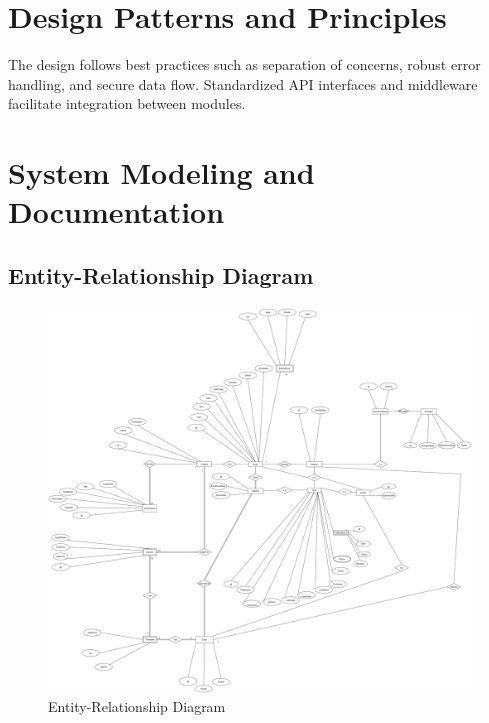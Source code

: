 \documentclass[12pt,a4paper]{report}
\begin{document}
\section{Design Patterns and Principles}
The design follows best practices such as separation of concerns, robust error handling, and secure data flow. Standardized API interfaces and middleware facilitate integration between modules.

\section{System Modeling and Documentation}
\subsection{Entity-Relationship Diagram}
\begin{figure}[htbp]
    \centering
    \includegraphics[width=1\textwidth]{er-diagram.png}
    \caption{Entity-Relationship Diagram}
    \label{fig:er-diagram}
\end{figure}
\end{document}
